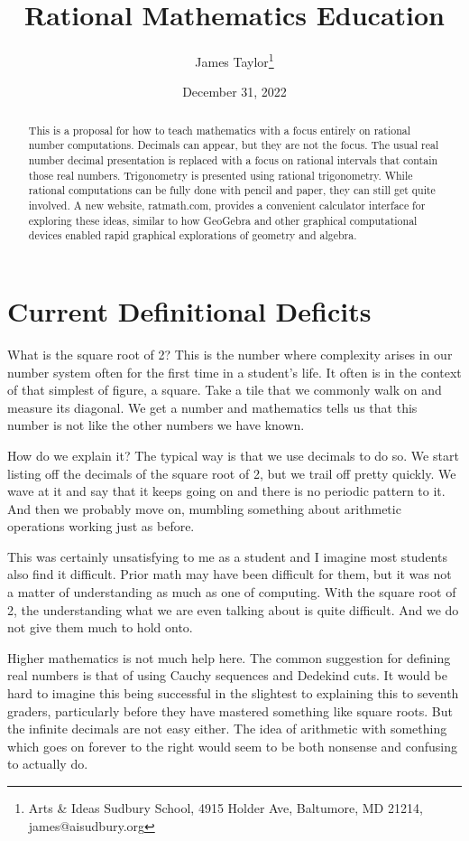 \documentclass[12pt]{article}
\title{Rational Mathematics Education}
\author{
  James Taylor\footnote{Arts \& Ideas Sudbury School, 4915 Holder Ave, Baltumore, MD 21214, james@aisudbury.org}
}
\date{December 31, 2022}
\theoremstyle{remark}
\begin{document}
\maketitle
\begin{abstract}
This is a proposal for how to teach mathematics with a focus entirely on rational number computations. Decimals can appear, but they are not the focus. The usual real number decimal presentation is replaced with a focus on rational intervals that contain those real numbers. Trigonometry is presented using rational trigonometry. While rational computations can be fully done with pencil and paper, they can still get quite involved. A new website, ratmath.com, provides a convenient calculator interface for exploring these ideas, similar to how GeoGebra and other graphical computational devices enabled rapid graphical explorations of geometry and algebra. 
\end{abstract}

\tableofcontents

\section{Current Definitional Deficits}

What is the square root of 2? This is the number where complexity arises in our number system often for the first time in a student's life. It often is in the context of that simplest of figure, a square. Take a tile that we commonly walk on and measure its diagonal. We get a number and mathematics tells us that this number is not like the other numbers we have known. 

How do we explain it? The typical way is that we use decimals to do so. We start listing off the decimals of the square root of 2, but we trail off pretty quickly. We wave at it and say that it keeps going on and there is no periodic pattern to it. And then we probably move on, mumbling something about arithmetic operations working just as before. 

This was certainly unsatisfying to me as a student and I imagine most students also find it difficult. Prior math may have been difficult for them, but it was not a matter of understanding as much as one of computing. With the square root of 2, the understanding what we are even talking about is quite difficult. And we do not give them much to hold onto. 

Higher mathematics is not much help here. The common suggestion for defining real numbers is that of using Cauchy sequences and Dedekind cuts. It would be hard to imagine this being successful in the slightest to explaining this to seventh graders, particularly before they have mastered something like square roots. But the infinite decimals are not easy either. The idea of arithmetic with something which goes on forever to the right would seem to be both nonsense and confusing to actually do. 
\end{document}
